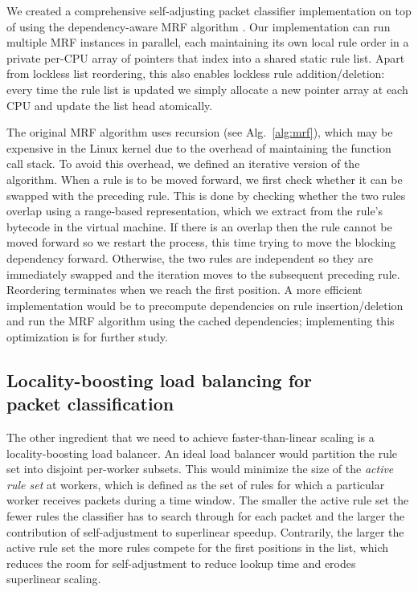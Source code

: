 We created a comprehensive self-adjusting packet classifier implementation on top of \nftables using the dependency-aware MRF algorithm \cite{10228937}. Our implementation can run multiple MRF instances in parallel, each maintaining its own local rule order in a private per-CPU array of pointers that index into a shared static rule list. Apart from lockless list reordering, this also enables lockless rule addition\slash deletion: every time the rule list is updated we simply allocate a new pointer array at each CPU and update the list head atomically.

The original MRF algorithm uses recursion (see Alg.~\ref{alg:mrf}), which may be expensive in the Linux kernel due to the overhead of maintaining the function call stack. To avoid this overhead, we defined an iterative version of the algorithm. When a rule is to be moved forward, we first check whether it can be swapped with the preceding rule. This is done by checking whether the two rules overlap using a range-based representation, which we extract from the rule's bytecode in the \nftables virtual machine. If there is an overlap then the rule cannot be moved forward so we restart the process, this time trying to move the blocking dependency forward. Otherwise, the two rules are independent so they are immediately swapped and the iteration moves to the subsequent preceding rule. Reordering terminates when we reach the first position. A more efficient implementation would be to precompute dependencies on rule insertion\slash deletion and run the MRF algorithm using the cached dependencies; implementing this optimization is for further study. %

\subsection{Locality-boosting load balancing for\\ packet classification}
\label{sec:sa-rss}

The other ingredient that we need to achieve faster-than-linear scaling is a locality-boosting load balancer.  An ideal load balancer would partition the rule set into disjoint per-worker subsets. This would minimize the size of the \emph{active rule set} at workers, which is defined as the set of rules for which a particular worker receives packets during a time window. The smaller the active rule set the fewer rules the classifier has to search through for each packet and the larger the contribution of self-adjustment to superlinear speedup. Contrarily, the larger the active rule set the more rules compete for the first positions in the list, which reduces the room for self-adjustment to reduce lookup time and erodes superlinear scaling.

